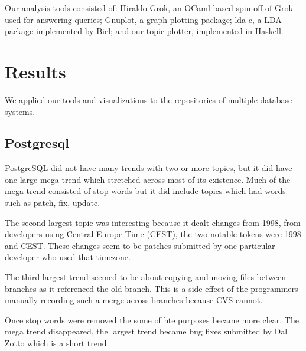 \documentclass[times, 10pt,twocolumn]{article}
\begin{document}
Our analysis tools consisted of: Hiraldo-Grok, an OCaml based spin off
of Grok used for answering queries; Gnuplot, a graph plotting package;
lda-c, a LDA package implemented by Biel; and our topic plotter,
implemented in Haskell.















\section{Results}

We applied our tools and visualizations to the repositories of
multiple database systems. 

\subsection{Postgresql}

PostgreSQL did not have many trends with two or more topics, but it
did have one large mega-trend which stretched across most of its
existence. Much of the mega-trend consisted of stop words but it did
include topics which had words such as patch, fix, update.

The second largest topic was interesting because it dealt changes from
1998, from developers using Central Europe Time (CEST), the two
notable tokens were 1998 and CEST. These changes seem to be patches
submitted by one particular developer who used that timezone.

The third largest trend seemed to be about copying and moving files
between branches as it referenced the old branch. This is a side
effect of the programmers manually recording such a merge across
branches because CVS cannot.

Once stop words were removed the some of hte purposes became more
clear. The mega trend disappeared, the largest trend became bug fixes
submitted by Dal Zotto which is a short trend.


\end{document}
